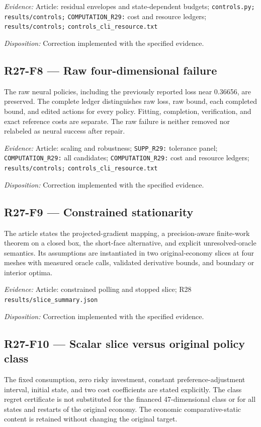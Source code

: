 \emph{Evidence:} Article: residual envelopes and state-dependent budgets; \nolinkurl{controls.py;} \nolinkurl{results/controls;} \nolinkurl{COMPUTATION_R29:} cost and resource ledgers; \nolinkurl{results/controls;} \nolinkurl{controls_cli_resource.txt}

\emph{Disposition:} Correction implemented with the specified evidence.
\subsection{R27-F8 --- Raw four-dimensional failure}
The raw neural policies, including the previously reported loss near 0.36656, are preserved. The complete ledger distinguishes raw loss, raw bound, each completed bound, and edited actions for every policy. Fitting, completion, verification, and exact reference costs are separate. The raw failure is neither removed nor relabeled as neural success after repair.

\emph{Evidence:} Article: scaling and robustness; \nolinkurl{SUPP_R29:} tolerance panel; \nolinkurl{COMPUTATION_R29:} all candidates; \nolinkurl{COMPUTATION_R29:} cost and resource ledgers; \nolinkurl{results/controls;} \nolinkurl{controls_cli_resource.txt}

\emph{Disposition:} Correction implemented with the specified evidence.
\subsection{R27-F9 --- Constrained stationarity}
The article states the projected-gradient mapping, a precision-aware finite-work theorem on a closed box, the short-face alternative, and explicit unresolved-oracle semantics. Its assumptions are instantiated in two original-economy slices at four meshes with measured oracle calls, validated derivative bounds, and boundary or interior optima.

\emph{Evidence:} Article: constrained polling and stopped slice; R28 \nolinkurl{results/slice_summary.json}

\emph{Disposition:} Correction implemented with the specified evidence.
\subsection{R27-F10 --- Scalar slice versus original policy class}
The fixed consumption, zero risky investment, constant preference-adjustment interval, initial state, and two cost coefficients are stated explicitly. The class regret certificate is not substituted for the financed 47-dimensional class or for all states and restarts of the original economy. The economic comparative-static content is retained without changing the original target.

